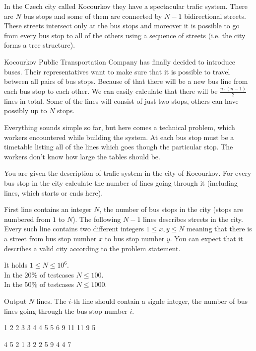





In the Czech city called Kocourkov they have a spectacular trafic system.
There are $N$ bus stops and some of them are connected by $N - 1$ bidirectional streets.
These streets intersect only at the bus stops and moreover it is possible to go from every bus stop
to all of the others using a sequence of streets (i.e. the city forms a tree structure).

Kocourkov Public Transportation Company has finally decided to introduce buses.
Their representatives want to make sure that it is possible to travel between all pairs of bus stops.
Because of that there will be a new bus line from each bus stop to each other.
We can easily calculate that there will be $\frac{n \cdot (n - 1)}{2}$ lines in total.
Some of the lines will consist of just two stops, others can have possibly up to $N$ stops.

Everything sounds simple so far, but here comes a technical problem, which workers encountered while building the system.
At each bus stop must be a timetable listing all of the lines which goes though the particular stop.
The workers don't know how large the tables should be.


You are given the description of trafic system in the city of Kocourkov.
For every bus stop in the city calculate the number of lines going through it (including lines, which starts or ends here).


First line contains an integer $N$, the number of bus stops in the city (stops are numbered from $1$ to $N$).
The following $N - 1$ lines describes streets in the city.
Every such line contains two different integers $1 \le x, y \le N$ meaning that there is a street from bus stop number $x$ to bus stop number $y$.
You can expect that it describes a valid city according to the problem statement.

\smallskip

It holds $1 \leq N \leq 10^6$.\\
In the $20\%$ of testcases $N \leq 100$.\\
In the $50\%$ of testcases $N \leq 1000$.


Output $N$ lines. The $i$-th line should contain a signle integer, the number of bus lines going through the bus stop number $i$.


1 2
2 3
3 4
4 5
5 6
9
11
11
9
5
\sampleEND

\bigskip

4 5
2 1
3 2
2 5
9
4
4
7
\sampleEND


